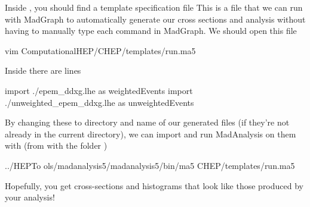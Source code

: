 Inside , you should find a template specification file 
This is a file that we can run with MadGraph to automatically generate our cross sections and analysis without having to manually type each command in MadGraph. We should open this file
\begin{codeenv}
    vim ComputationalHEP/CHEP/templates/run.ma5
\end{codeenv}
Inside there are lines
\begin{codeenv}
    import ./epem_ddxg.lhe as weightedEvents
import ./unweighted_epem_ddxg.lhe as unweightedEvents
\end{codeenv}
By changing these to directory and name of our generated files (if they're not already in the current directory), we can import and run MadAnalysis on them with (from with the folder )
\begin{codeenv}
    ../HEPTo
ols/madanalysis5/madanalysis5/bin/ma5 CHEP/templates/run.ma5
\end{codeenv}
Hopefully, you get cross-sections and histograms that look like those produced by your analysis!